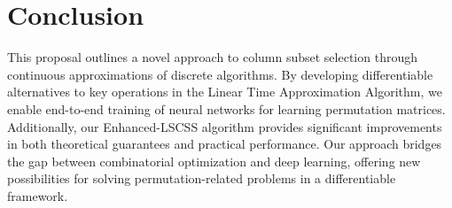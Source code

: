 \documentclass{article}
\begin{document}
\section{Conclusion}
This proposal outlines a novel approach to column subset selection through continuous approximations of discrete algorithms. By developing differentiable alternatives to key operations in the Linear Time Approximation Algorithm, we enable end-to-end training of neural networks for learning permutation matrices. Additionally, our Enhanced-LSCSS algorithm provides significant improvements in both theoretical guarantees and practical performance. Our approach bridges the gap between combinatorial optimization and deep learning, offering new possibilities for solving permutation-related problems in a differentiable framework.



\end{document}
